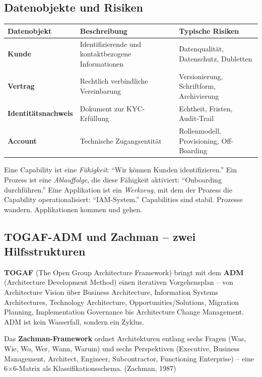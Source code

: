 \documentclass[11pt,a4paper,oneside]{article}
\newcommand{\fachbegriff}[1]{\textbf{#1}}
\newcommand{\quelle}[1]{{\footnotesize\color{lpGray}(#1)}}
\begin{document}
\subsection{Datenobjekte und Risiken}

\begin{tabularx}{\linewidth}{@{}>{\bfseries}lXX@{}}
\toprule
Datenobjekt & Beschreibung & Typische Risiken \\
\midrule
Kunde & Identifizierende und kontaktbezogene Informationen & Datenqualität, Datenschutz, Dubletten \\
Vertrag & Rechtlich verbindliche Vereinbarung & Versionierung, Schriftform, Archivierung \\
Identitäts\-nachweis & Dokument zur KYC-Erfüllung & Echtheit, Fristen, Audit-Trail \\
Account & Technische Zugangsentität & Rollenmodell, Provisioning, Off-Boarding \\
\bottomrule
\end{tabularx}

\medskip

\begin{merkbox}
Eine Capability ist eine \emph{Fähigkeit}: ``Wir können Kunden identifizieren.'' Ein Prozess ist eine \emph{Ablauffolge}, die diese Fähigkeit aktiviert: ``Onboarding durchführen.'' Eine Applikation ist ein \emph{Werkzeug}, mit dem der Prozess die Capability operationalisiert: ``IAM-System.'' Capabilities sind stabil. Prozesse wandern. Applikationen kommen und gehen.
\end{merkbox}

\subsection{TOGAF-ADM und Zachman -- zwei Hilfsstrukturen}

\fachbegriff{TOGAF} (The Open Group Architecture Framework) bringt mit dem \fachbegriff{ADM} (Architecture Development Method) einen iterativen Vorgehensplan -- von Architecture Vision über Business Architecture, Information Systems Architectures, Technology Architecture, Opportunities/Solutions, Migration Planning, Implementation Governance bis Architecture Change Management. ADM ist kein Wasserfall, sondern ein Zyklus.

Das \fachbegriff{Zachman-Framework} ordnet Architekturen entlang sechs Fragen (Was, Wie, Wo, Wer, Wann, Warum) und sechs Perspektiven (Executive, Business Management, Architect, Engineer, Subcontractor, Functioning Enterprise) -- eine 6$\times$6-Matrix als Klassifikationsschema. \quelle{Zachman, 1987}
\end{document}
